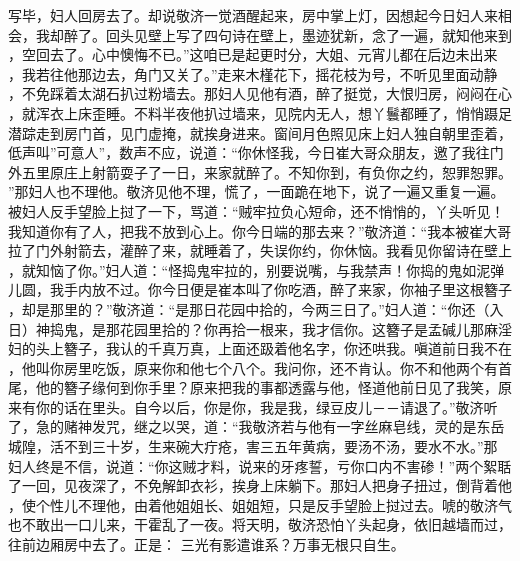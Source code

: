 写毕，妇人回房去了。却说敬济一觉酒醒起来，房中掌上灯，因想起今日妇人来相
会，我却醉了。回头见壁上写了四句诗在壁上，墨迹犹新，念了一遍，就知他来到
，空回去了。心中懊悔不已。”这咱已是起更时分，大姐、元宵儿都在后边未出来
，我若往他那边去，角门又关了。”走来木槿花下，摇花枝为号，不听见里面动静
，不免踩着太湖石扒过粉墙去。那妇人见他有酒，醉了挺觉，大恨归房，闷闷在心
，就浑衣上床歪睡。不料半夜他扒过墙来，见院内无人，想丫鬟都睡了，悄悄蹑足
潜踪走到房门首，见门虚掩，就挨身进来。窗间月色照见床上妇人独自朝里歪着，
低声叫”可意人”，数声不应，说道：“你休怪我，今日崔大哥众朋友，邀了我往门
外五里原庄上射箭耍子了一日，来家就醉了。不知你到，有负你之约，恕罪恕罪。
”那妇人也不理他。敬济见他不理，慌了，一面跪在地下，说了一遍又重复一遍。
被妇人反手望脸上挝了一下，骂道：“贼牢拉负心短命，还不悄悄的，丫头听见！
我知道你有了人，把我不放到心上。你今日端的那去来？”敬济道：“我本被崔大哥
拉了门外射箭去，灌醉了来，就睡着了，失误你约，你休恼。我看见你留诗在壁上
，就知恼了你。”妇人道：“怪捣鬼牢拉的，别要说嘴，与我禁声！你捣的鬼如泥弹
儿圆，我手内放不过。你今日便是崔本叫了你吃酒，醉了来家，你袖子里这根簪子
，却是那里的？”敬济道：“是那日花园中拾的，今两三日了。”妇人道：“你还（入
日）神捣鬼，是那花园里拾的？你再拾一根来，我才信你。这簪子是孟碱儿那麻淫
妇的头上簪子，我认的千真万真，上面还趿着他名字，你还哄我。嗔道前日我不在
，他叫你房里吃饭，原来你和他七个八个。我问你，还不肯认。你不和他两个有首
尾，他的簪子缘何到你手里？原来把我的事都透露与他，怪道他前日见了我笑，原
来有你的话在里头。自今以后，你是你，我是我，绿豆皮儿－－请退了。”敬济听
了，急的赌神发咒，继之以哭，道：“我敬济若与他有一字丝麻皂线，灵的是东岳
城隍，活不到三十岁，生来碗大疔疮，害三五年黄病，要汤不汤，要水不水。”那
妇人终是不信，说道：“你这贼才料，说来的牙疼誓，亏你口内不害碜！”两个絮聒
了一回，见夜深了，不免解卸衣衫，挨身上床躺下。那妇人把身子扭过，倒背着他
，使个性儿不理他，由着他姐姐长、姐姐短，只是反手望脸上挝过去。唬的敬济气
也不敢出一口儿来，干霍乱了一夜。将天明，敬济恐怕丫头起身，依旧越墙而过，
往前边厢房中去了。正是：
三光有影遣谁系？万事无根只自生。
